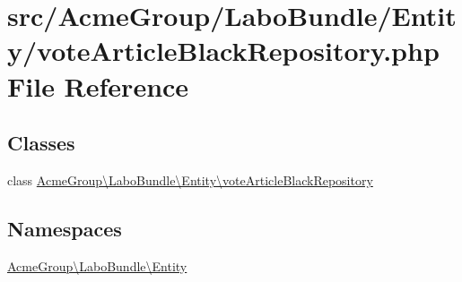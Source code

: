 \hypertarget{vote_article_black_repository_8php}{\section{src/\+Acme\+Group/\+Labo\+Bundle/\+Entity/vote\+Article\+Black\+Repository.php File Reference}
\label{vote_article_black_repository_8php}
}
\subsection*{Classes}
\begin{DoxyCompactItemize}
\item 
class \hyperlink{class_acme_group_1_1_labo_bundle_1_1_entity_1_1vote_article_black_repository}{Acme\+Group\textbackslash{}\+Labo\+Bundle\textbackslash{}\+Entity\textbackslash{}vote\+Article\+Black\+Repository}
\end{DoxyCompactItemize}
\subsection*{Namespaces}
\begin{DoxyCompactItemize}
\item 
 \hyperlink{namespace_acme_group_1_1_labo_bundle_1_1_entity}{Acme\+Group\textbackslash{}\+Labo\+Bundle\textbackslash{}\+Entity}
\end{DoxyCompactItemize}
